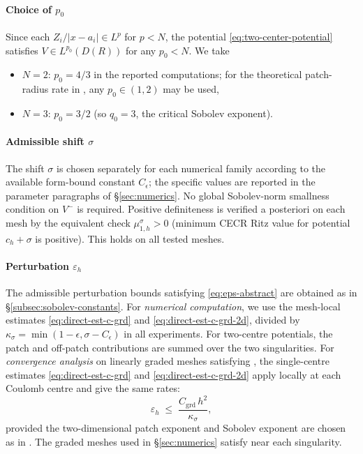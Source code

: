 \documentclass[11pt]{article}
\theoremstyle{plain}
\theoremstyle{definition}
\theoremstyle{remark}
\begin{document}
\paragraph{Choice of \texorpdfstring{$p_0$}{p0}}
Since each $Z_i/|x-a_i| \in L^p$ for $p < N$, the potential
\eqref{eq:two-center-potential} satisfies $V \in L^{p_0}(D(R))$
for any $p_0 < N$.  We take
\begin{itemize}
  \item $N=2$: $p_0 = 4/3$ in the reported computations; for the
    theoretical patch-radius rate in , any
    $p_0\in(1,2)$ may be used,
  \item $N=3$: $p_0 = 3/2$ (so $q_0=3$, the critical Sobolev exponent).
\end{itemize}

\paragraph{Admissible shift \texorpdfstring{$\sigma$}{sigma}}
The shift $\sigma$ is chosen separately for each numerical family
according to the available form-bound constant $C_\epsilon$; the
specific values are reported in the parameter paragraphs of
\S\ref{sec:numerics}. No global Sobolev-norm smallness condition on
$V^-$ is required. Positive definiteness is verified a posteriori on
each mesh by the equivalent check $\mu_{1,h}^\sigma>0$ (minimum CECR
Ritz value for potential $c_h+\sigma$ is positive). This holds on all
tested meshes.

\paragraph{Perturbation \texorpdfstring{$\varepsilon_h$}{epsilon\_h}}
The admissible perturbation bounds satisfying \eqref{eq:eps-abstract}
are obtained as in \S\ref{subsec:sobolev-constants}.  For
\emph{numerical computation}, we use the mesh-local estimates
\eqref{eq:direct-est-c-grd} and \eqref{eq:direct-est-c-grd-2d}, divided
by $\kappa_\sigma=\min(1-\epsilon,\sigma-C_\epsilon)$ in all
experiments.  For two-centre potentials, the patch and off-patch
contributions are summed over the two singularities.  For
\emph{convergence analysis} on linearly graded meshes satisfying
, the single-centre estimates
\eqref{eq:direct-est-c-grd} and \eqref{eq:direct-est-c-grd-2d} apply locally at
each Coulomb centre and give the same rates:
\begin{equation}
\label{eq:eps-h-twocenter}
  \varepsilon_h \;\le\; \frac{C_{\mathrm{grd}}\,h^2}{\kappa_\sigma},
\end{equation}
provided the two-dimensional patch exponent and Sobolev exponent are
chosen as in .
The graded meshes used in \S\ref{sec:numerics} satisfy
 near each singularity.
\end{document}
